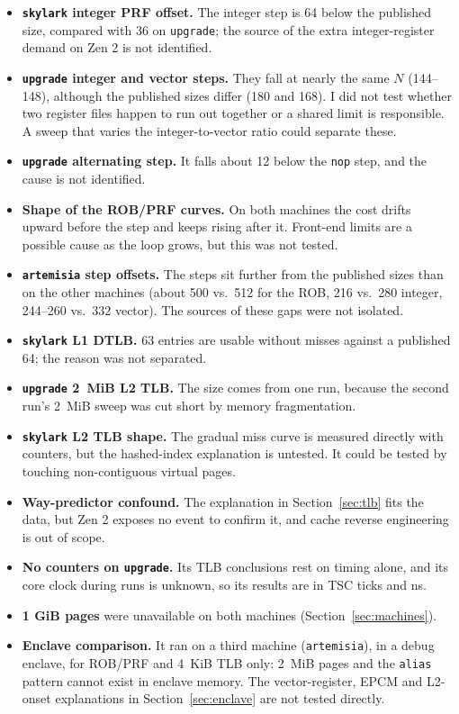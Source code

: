 \documentclass[11pt]{article}
\newcommand{\up}{\texttt{upgrade}}
\newcommand{\sk}{\texttt{skylark}}
\begin{document}
\begin{itemize}
\item \textbf{\sk{} integer PRF offset.} The integer step is 64 below the
  published size, compared with 36 on \up; the source of the extra
  integer-register demand on Zen 2 is not identified.
\item \textbf{\up{} integer and vector steps.} They fall at nearly the same
  $N$ (144--148), although the published sizes differ (180 and 168). I did
  not test whether two register files happen to run out together or a shared
  limit is responsible. A sweep that varies the integer-to-vector ratio could
  separate these.
\item \textbf{\up{} alternating step.} It falls about 12 below the
  \texttt{nop} step, and the cause is not identified.
\item \textbf{Shape of the ROB/PRF curves.} On both machines the cost drifts
  upward before the step and keeps rising after it. Front-end limits are a
  possible cause as the loop grows, but this was not tested.
\item \textbf{\texttt{artemisia} step offsets.} The steps sit further from the
  published sizes than on the other machines (about 500 vs.\ 512 for the ROB,
  216 vs.\ 280 integer, 244--260 vs.\ 332 vector). The sources of these gaps
  were not isolated.
\item \textbf{\sk{} L1 DTLB.} 63 entries are usable without misses against a
  published 64; the reason was not separated.
\item \textbf{\up{} 2~MiB L2 TLB.} The size comes from one run, because the
  second run's 2~MiB sweep was cut short by memory fragmentation.
\item \textbf{\sk{} L2 TLB shape.} The gradual miss curve is measured
  directly with counters, but the hashed-index explanation is untested. It
  could be tested by touching non-contiguous virtual pages.
\item \textbf{Way-predictor confound.} The explanation in
  Section~\ref{sec:tlb} fits the data, but Zen 2 exposes no event to confirm
  it, and cache reverse engineering is out of scope.
\item \textbf{No counters on \up{}.} Its TLB conclusions rest on timing
  alone, and its core clock during runs is unknown, so its results are in
  TSC ticks and ns.
\item \textbf{1 GiB pages} were unavailable on both machines
  (Section~\ref{sec:machines}).
\item \textbf{Enclave comparison.} It ran on a third machine (\texttt{artemisia}),
  in a debug enclave, for ROB/PRF and 4~KiB TLB only: 2~MiB pages and the
  \texttt{alias} pattern cannot exist in enclave memory. The vector-register,
  EPCM and L2-onset explanations in Section~\ref{sec:enclave} are not tested
  directly.
\end{itemize}
\end{document}
